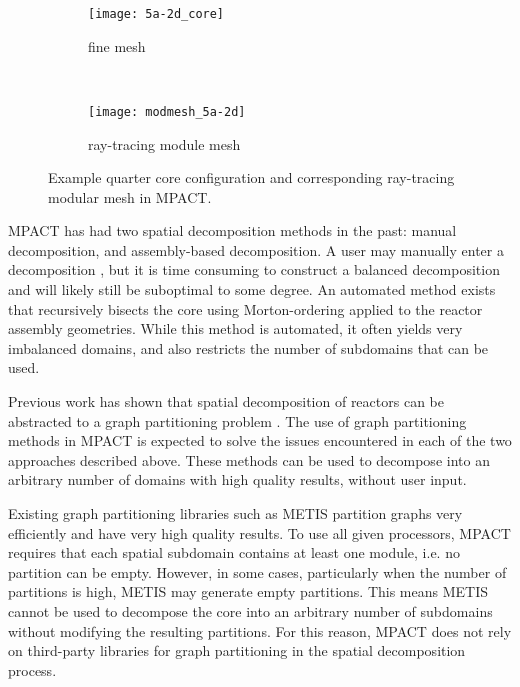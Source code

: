 {{    \begin{figure}
      \centering
      \begin{subfigure}[t]{0.45\textwidth}
        \centering
        \texttt{[image: 5a-2d\_core]}
        \caption{fine mesh\label{fig:Spatial Decomposition:5a-2d configuration}}
      \end{subfigure}%
      ~
      \begin{subfigure}[t]{0.45\textwidth}
        \centering
        \texttt{[image: modmesh\_5a-2d]}
        \caption{ray-tracing module mesh\label{fig:Spatial Decomposition:5a-2d modular mesh}}
      \end{subfigure}
      \caption{Example quarter core configuration and corresponding ray-tracing modular mesh in MPACT. \label{fig:Spatial Decomposition:5a-2d abstraction}}
    \end{figure}

    MPACT has had two spatial decomposition methods in the past: manual decomposition, and assembly-based decomposition.
    A user may manually enter a decomposition \cite{StimpsonPartitioning2017}, but it is time consuming to construct a balanced decomposition and will likely still be suboptimal to some degree.
    An automated method exists that recursively bisects the core using Morton-ordering \cite{Morton1966} applied to the reactor assembly geometries.
    While this method is automated, it often yields very imbalanced domains, and also restricts the number of subdomains that can be used.

    Previous work has shown that spatial decomposition of reactors can be abstracted to a graph partitioning problem \cite{Fitzgerald2017}.
    The use of graph partitioning methods in MPACT is expected to solve the issues encountered in each of the two approaches described above.
    These methods can be used to decompose into an arbitrary number of domains with high quality results, without user input.

    Existing graph partitioning libraries such as METIS \cite{METIS} partition graphs very efficiently and have very high quality results.
    To use all given processors, MPACT requires that each spatial subdomain contains at least one module, i.e. no partition can be empty.
    However, in some cases, particularly when the number of partitions is high, METIS may generate empty partitions.
    This means METIS cannot be used to decompose the core into an arbitrary number of subdomains without modifying the resulting partitions.
    For this reason, MPACT does not rely on third-party libraries for graph partitioning in the spatial decomposition process.
  }
}

